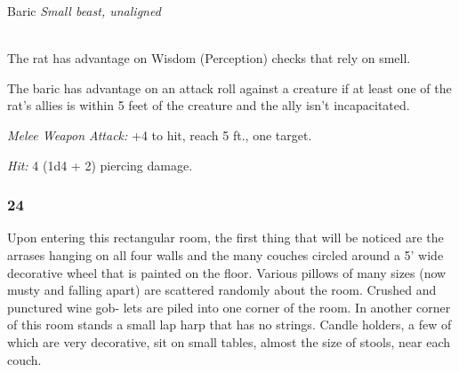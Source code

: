 \documentclass[palace_of_the_silver_princess]{subfiles}
\begin{document}
\begin{monsterbox}{Baric}
    \textit{Small beast, unaligned}\\
    \hline
    \basics[%
        armorclass = 12,
        hitpoints  = 7 (2d6),
        speed      = {30 ft.}
    ]
    \hline
    \stats[
        STR = \stat{7},
        DEX = \stat{15},
        CON = \stat{11},
        INT = \stat{2},
        WIS = \stat{10},
        CHA = \stat{4}
    ]
    \hline
    \details[
        senses = {darkvision 60 ft., passive Perception 10},
        languages = {---},
        challenge = {1/8 (25 XP)},
    ]
    \hline
    \\[1mm]
    \begin{monsteraction}
        The rat has advantage on Wisdom (Perception) checks that rely on
        smell.
    \end{monsteraction}

    \begin{monsteraction}
        The baric has advantage on an attack roll against a creature if at
        least one of the rat's allies is within 5 feet of the creature
        and the ally isn't incapacitated.
    \end{monsteraction}
    \begin{monsteraction}[Bite]
        \textit{Melee Weapon Attack:} +4 to hit, reach 5 ft., one
        target.

        \textit{Hit:} 4 (1d4 + 2) piercing damage.
    \end{monsteraction}
\end{monsterbox}

\subsubsection{24}
\begin{quotebox}
    Upon entering this rectangular room, the first thing that will be
    noticed are the arrases hanging on all four walls and the many
    couches circled around a 5’ wide decorative wheel that is painted on
    the floor. Various pillows of many sizes (now musty and falling
    apart) are scattered randomly about the room. Crushed and punctured
    wine gob- lets are piled into one corner of the room. In another
    corner of this room stands a small lap harp that has no strings.
    Candle holders, a few of which are very decorative, sit on small
    tables, almost the size of stools, near each couch.
\end{quotebox}
\end{document}
